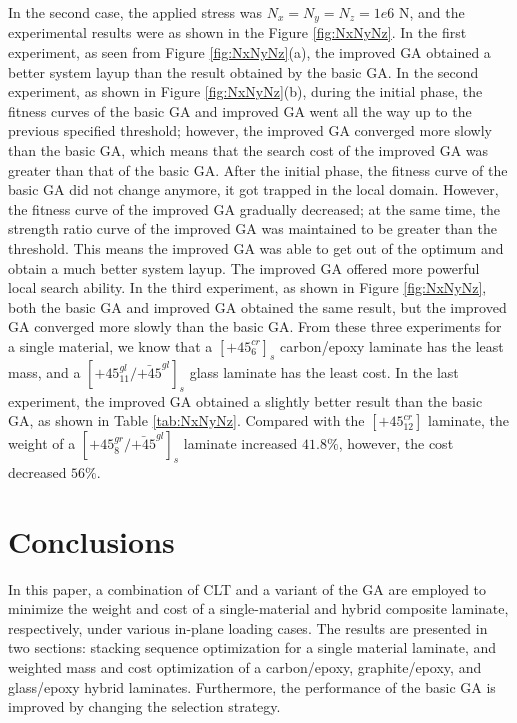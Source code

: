 \documentclass[USenglish]{article}
\begin{document}
In the second case, the applied stress was $N_x=N_y=N_z=1e6$ N, and the experimental results were as
shown in the Figure \ref{fig:NxNyNz}. In the first experiment, as seen from Figure \ref{fig:NxNyNz}(a), the improved GA obtained a
better system layup than the result obtained by the basic GA. In the second experiment, as shown in Figure \ref{fig:NxNyNz}(b), during
the initial phase, the fitness curves of the basic GA and improved GA went all the way up to the
previous specified threshold; however, the improved GA converged more slowly than the basic GA, which
means that the search cost of the improved GA was greater than that of the basic GA. After the initial phase, the fitness
curve of the basic GA did not change anymore, it got trapped in the local domain.%
 However, the fitness curve of the
improved GA gradually decreased; at the same time, the strength ratio curve of the improved GA
was maintained to be greater than the threshold. This means the improved GA was able to get out of the optimum
and obtain a much better system layup. The improved GA offered more powerful local search
ability. In the third experiment, as shown in Figure \ref{fig:NxNyNz}, both the basic GA and improved
GA obtained the same result, but the improved GA converged more slowly than the basic GA. From these
three experiments for a single material, we know that a $[\text{+}45_{6}^{cr}]_s$ carbon/epoxy laminate has
the least mass, and a $[\text{+}45_{11}^{gl}/\bar{\text{+}45}^{gl}]_s$ glass laminate has the least
cost. In the last experiment, the improved GA obtained a slightly better result than the basic GA,
as shown in Table \ref{tab:NxNyNz}. Compared with the $[\text{+}45_{12}^{cr}]$ laminate, the
weight of a $[\text{+}45_8^{gr}/\bar{\text{+}45}^{gl}]_s$ laminate increased $41.8\%$, however, the
cost decreased $56\%$.


\section{Conclusions}
In this paper, a combination of CLT and a variant of the GA are employed to minimize the weight and cost
of a single-material and hybrid composite laminate, respectively, under various in-plane loading
cases. The results are presented in two sections: stacking sequence optimization for a single material
laminate, and weighted mass and cost optimization of a carbon/epoxy, graphite/epoxy, and
glass/epoxy hybrid laminates. Furthermore, the performance of the basic GA is improved by changing the
selection strategy.
\end{document}
